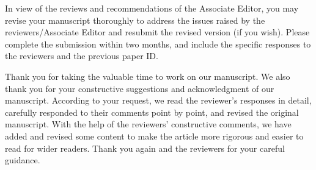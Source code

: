 
\editor

\begin{generalcomment}
In view of the reviews and recommendations of the Associate Editor, you may revise your manuscript thoroughly to address the issues raised by the reviewers/Associate Editor and resubmit the revised version (if you wish). Please complete the submission within two months, and include the specific responses to the reviewers and the previous paper ID. 
\end{generalcomment}
\begin{revmeta}[]
Thank you for taking the valuable time to work on our manuscript. We also thank you for your constructive suggestions and acknowledgment of our manuscript. According to your request, we read the reviewer's responses in detail, carefully responded to their comments point by point, and revised the original manuscript. With the help of the reviewers' constructive comments, we have added and revised some content to make the article more rigorous and easier to read for wider readers. Thank you again and the reviewers for your careful guidance.
\end{revmeta}
